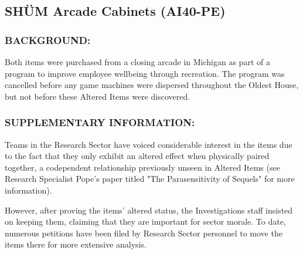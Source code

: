 \subsection*{SHÜM Arcade Cabinets (AI40-PE)}
\subsubsection*{BACKGROUND:}
\par Both items were purchased from a closing arcade in 
Michigan as part of a program to improve employee wellbeing
through recreation. The program was cancelled before any game
machines were dispersed throughout the Oldest House, but not
before these Altered Items were discovered.
\subsubsection*{SUPPLEMENTARY INFORMATION:}
\par Teams in the Research Sector have voiced considerable interest
in the items due to the fact that they only exhibit an altered effect
when physically paired together, a codependent relationship
previously unseen in Altered Items (see Research Specialist
Pope's paper titled "The Parasensitivity of Sequels" for more
information).
\par However, after proving the items' altered status, the Investigations
staff insisted on keeping them, claiming that they are important for
sector morale. To date, numerous petitions have been filed by
Research Sector personnel to move the items there for more
extensive analysis.